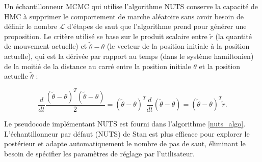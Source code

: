 Un échantillonneur MCMC qui utilise l’algorithme NUTS conserve la capacité de HMC à supprimer le comportement de marche aléatoire sans avoir besoin de définir le nombre \(\displaystyle \mathcal{L}  \) d'étapes de saut que l'algorithme prend pour générer une proposition. Le critère utilisé se base sur le produit scalaire entre \(\displaystyle \widetilde{r}  \) (la quantité de mouvement actuelle) et \(\displaystyle \widetilde{\theta} - \theta  \) (le vecteur de la position initiale à la position actuelle), qui est la dérivée par rapport au temps (dans le système hamiltonien) de la moitié de la distance au carré entre la position initiale \(\displaystyle \theta  \) et la position actuelle \(\displaystyle \widetilde{\theta}  \) \cite{hoffman2014no}:

\begin{equation}
	\frac{d}{dt} \frac{ (\widetilde{\theta} - \theta)^{T} (\widetilde{\theta} - \theta )}{2} = (\widetilde{\theta} - \theta)^{T} \frac{d}{dt} (\widetilde{\theta} - \theta) = (\widetilde{\theta} - \theta)^{T} \widetilde{r}.  
\end{equation}

\noindent Le pseudocode implémentant NUTS est fourni dans l'algorithme \ref{nuts_algo}. L'échantillonneur par défaut (NUTS) de Stan est plus efficace pour explorer le postérieur \cite{hoffman2011no}  \cite{hoffman2014no} et adapte automatiquement le nombre de pas de saut, éliminant le besoin de spécifier les paramètres de réglage par l'utilisateur.

